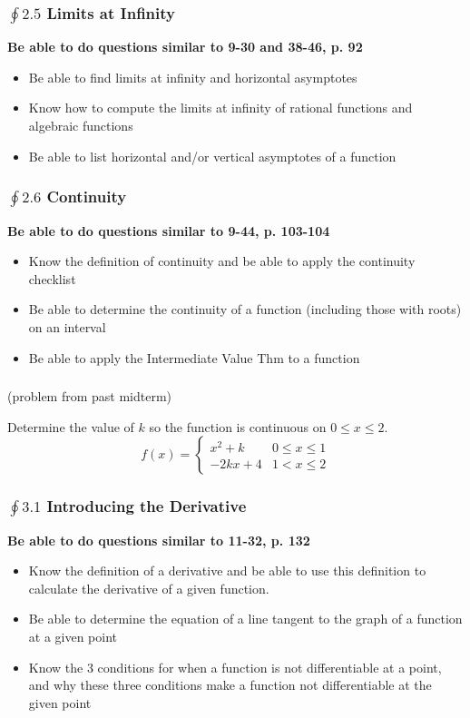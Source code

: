 \documentclass[14pt]{beamer}
\begin{document}
\begin{frame}
\frametitle{\small $\oint 2.5$ Limits at Infinity}
\small
{\bf Be able to do questions similar to 9-30 and 38-46, p. 92}
\begin{itemize}
\item Be able to find limits at infinity and horizontal asymptotes 
\item Know how to compute the limits at infinity of rational functions and algebraic functions
\item Be able to list horizontal and/or vertical asymptotes of a function
\end{itemize}
\end{frame}

\begin{frame}
\frametitle{\small $\oint 2.6$ Continuity}
\small
{\bf Be able to do questions similar to 9-44, p. 103-104}
\begin{itemize}
\item Know the definition of continuity and be able to apply the continuity checklist
\item Be able to determine the continuity of a function (including those with roots) on an interval
\item Be able to apply the Intermediate Value Thm to a function
\end{itemize}
\end{frame}

\begin{frame}
\frametitle{}
\small
(problem from past midterm)

\begin{exe}
Determine the value of $k$ so the function is continuous on $0\leq x\leq 2$.
\[f(x)=\begin{cases}x^2+k & 0\leq x\leq 1 \\
	-2kx+4 & 1<x\leq 2\end{cases}
	\]
\end{exe}	
\end{frame}

\begin{frame}
\frametitle{\small $\oint 3.1$ Introducing the Derivative}
\small
{\bf Be able to do questions similar to 11-32, p. 132}

\begin{itemize}
\item Know the definition of a derivative and be able to use this definition to calculate the derivative of a given function.
\item Be able to determine the equation of a line tangent to the graph of a function at a given point
\item Know the 3 conditions for when a function is not differentiable at a point, and why these three conditions make a function not differentiable at the given point
\end{itemize}
\end{frame}
\end{document}
